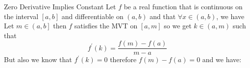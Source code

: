 \begin{theo*}{Zero Derivative Implies Constant}
  Let $f$ be a real function that is continuous on the interval $ \left[ a, b \right]$ and differentiable on $ \left(  a, b \right)$ and that $\forall x \in \left( a , b \right)$, we have 
    Let $m \in \left( a, b \right]$ then $f$ satisfies the MVT on $ \left[ a, m \right]$ so we get $k \in \left( a, m \right)$ such that 
    \[
    f ^{\prime}\left(k\right) = \frac{f\left(m\right)  -  f\left(a\right)}{m  -  a}
    \]
    But also we know that $f ^{\prime}\left(k\right) = 0$ therefore $f\left(m\right)  -  f\left(a\right) = 0$ and we have:
\end{theo*}





